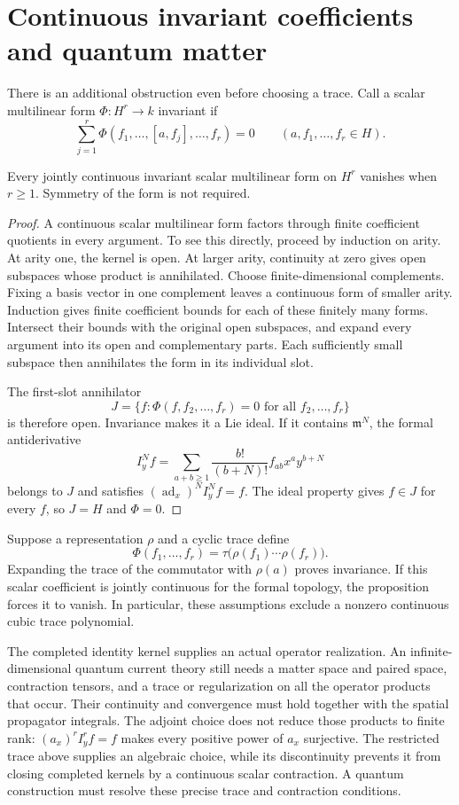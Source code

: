 \section{Continuous invariant coefficients and quantum matter}

There is an additional obstruction even before choosing a trace.
Call a scalar multilinear form $\Phi:H^r\to k$ invariant if
\[
 \sum_{j=1}^r
 \Phi(f_1,\ldots,[a,f_j],\ldots,f_r)=0
 \qquad(a,f_1,\ldots,f_r\in H).
\]

\begin{proposition}
Every jointly continuous invariant scalar multilinear form on $H^r$
vanishes when $r\geq1$. Symmetry of the form is not required.
\end{proposition}
\begin{proof}
A continuous scalar multilinear form factors through finite coefficient
quotients in every argument. To see this directly, proceed by induction
on arity. At arity one, the kernel is open. At larger arity, continuity
at zero gives open subspaces whose product is annihilated. Choose
finite-dimensional complements. Fixing a basis vector in one complement
leaves a continuous form of smaller arity. Induction gives finite
coefficient bounds for each of these finitely many forms. Intersect their
bounds with the original open subspaces, and expand every argument into
its open and complementary parts. Each sufficiently small subspace then
annihilates the form in its individual slot.

The first-slot annihilator
\[
 J=\{f:\Phi(f,f_2,\ldots,f_r)=0\text{ for all }f_2,\ldots,f_r\}
\]
is therefore open. Invariance makes it a Lie ideal. If it contains
$\mathfrak m^N$, the formal antiderivative
\[
 I_y^Nf=\sum_{a+b\geq1}\frac{b!}{(b+N)!}f_{ab}x^ay^{b+N}
\]
belongs to $J$ and satisfies $(\operatorname{ad}_x)^NI_y^Nf=f$.
The ideal property gives $f\in J$ for every $f$, so $J=H$ and $\Phi=0$.
\end{proof}

Suppose a representation $\rho$ and a cyclic trace define
\[
 \Phi(f_1,\ldots,f_r)
       =\tau\bigl(\rho(f_1)\cdots\rho(f_r)\bigr).
\]
Expanding the trace of the commutator with $\rho(a)$ proves invariance.
If this scalar coefficient is jointly continuous for the formal topology,
the proposition forces it to vanish. In particular, these assumptions
exclude a nonzero continuous cubic trace polynomial.

The completed identity kernel supplies an actual operator realization.
An infinite-dimensional quantum current theory still needs a matter
space and paired space, contraction tensors, and a trace or regularization
on all the operator products that occur. Their continuity and convergence
must hold together with the spatial propagator integrals. The adjoint
choice does not reduce those products to finite rank:
$(a_x)^r I_y^r f=f$ makes every positive power of $a_x$ surjective.
The restricted trace above supplies
an algebraic choice, while its discontinuity prevents it from closing
completed kernels by a continuous scalar contraction. A quantum
construction must resolve these precise trace and contraction conditions.
